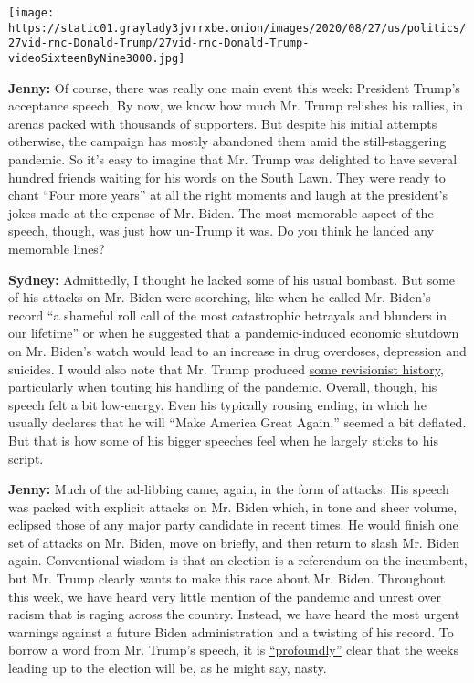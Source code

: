 \texttt{[image: https://static01.graylady3jvrrxbe.onion/images/2020/08/27/us/politics/27vid-rnc-Donald-Trump/27vid-rnc-Donald-Trump-videoSixteenByNine3000.jpg]}

\textbf{Jenny:} Of course, there was really one main event this week:
President Trump's acceptance speech. By now, we know how much Mr. Trump
relishes his rallies, in arenas packed with thousands of supporters. But
despite his initial attempts otherwise, the campaign has mostly
abandoned them amid the still-staggering pandemic. So it's easy to
imagine that Mr. Trump was delighted to have several hundred friends
waiting for his words on the South Lawn. They were ready to chant ``Four
more years'' at all the right moments and laugh at the president's jokes
made at the expense of Mr. Biden. The most memorable aspect of the
speech, though, was just how un-Trump it was. Do you think he landed any
memorable lines?

\textbf{Sydney:} Admittedly, I thought he lacked some of his usual
bombast. But some of his attacks on Mr. Biden were scorching, like when
he called Mr. Biden's record ``a shameful roll call of the most
catastrophic betrayals and blunders in our lifetime'' or when he
suggested that a pandemic-induced economic shutdown on Mr. Biden's watch
would lead to an increase in drug overdoses, depression and suicides. I
would also note that Mr. Trump produced
\href{https://www.nytimes3xbfgragh.onion/live/2020/08/27/us/rnc-fact-check}{some
revisionist history}, particularly when touting his handling of the
pandemic. Overall, though, his speech felt a bit low-energy. Even his
typically rousing ending, in which he usually declares that he will
``Make America Great Again,'' seemed a bit deflated. But that is how
some of his bigger speeches feel when he largely sticks to his script.

\textbf{Jenny:} Much of the ad-libbing came, again, in the form of
attacks. His speech was packed with explicit attacks on Mr. Biden which,
in tone and sheer volume, eclipsed those of any major party candidate in
recent times. He would finish one set of attacks on Mr. Biden, move on
briefly, and then return to slash Mr. Biden again. Conventional wisdom
is that an election is a referendum on the incumbent, but Mr. Trump
clearly wants to make this race about Mr. Biden. Throughout this week,
we have heard very little mention of the pandemic and unrest over racism
that is raging across the country. Instead, we have heard the most
urgent warnings against a future Biden administration and a twisting of
his record. To borrow a word from Mr. Trump's speech, it is
\href{https://www.nytimes3xbfgragh.onion/2020/08/27/us/politics/republican-national-convention-recap.html}{``profoundly''}
clear that the weeks leading up to the election will be, as he might
say, nasty.

